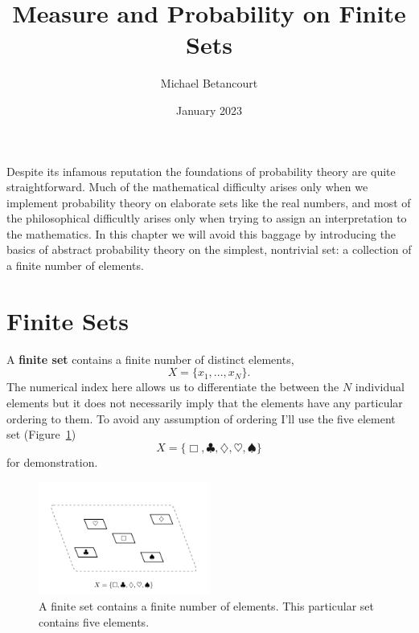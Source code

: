 \documentclass[
  letterpaper,
  DIV=11,
  numbers=noendperiod]{scrartcl}
\title{Measure and Probability on Finite Sets}
\author{Michael Betancourt}
\date{January 2023}
\renewcommand*\contentsname{Table of contents}
\newcommand\contentsname{Table of contents}
\begin{document}
\maketitle
\ifdefined\Shaded\renewenvironment{Shaded}{\begin{tcolorbox}[sharp corners, frame hidden, breakable, interior hidden, borderline west={3pt}{0pt}{shadecolor}, boxrule=0pt, enhanced]}{\end{tcolorbox}}\fi

\renewcommand*\contentsname{Table of contents}
{
\hypersetup{linkcolor=}
\setcounter{tocdepth}{3}
\tableofcontents
}
Despite its infamous reputation the foundations of probability theory
are quite straightforward. Much of the mathematical difficulty arises
only when we implement probability theory on elaborate sets like the
real numbers, and most of the philosophical difficultly arises only when
trying to assign an interpretation to the mathematics. In this chapter
we will avoid this baggage by introducing the basics of abstract
probability theory on the simplest, nontrivial set: a collection of a
finite number of elements.

\hypertarget{finite-sets}{%
\section{Finite Sets}\label{finite-sets}}

A \textbf{finite set} contains a finite number of distinct elements, \[
X = \{x_1, ..., x_N\}.
\] The numerical index here allows us to differentiate the between the
\(N\) individual elements but it does not necessarily imply that the
elements have any particular ordering to them. To avoid any assumption
of ordering I'll use the five element set (Figure~\ref{fig-ambient_set})
\[
X = \{\Box, \clubsuit, \diamondsuit, \heartsuit, \spadesuit\}
\] for demonstration.

\begin{figure}

{\centering \includegraphics[width=0.5\textwidth,height=\textheight]{figures/ambient_set/ambient_set.pdf}

}

\caption{\label{fig-ambient_set}A finite set contains a finite number of
elements. This particular set contains five elements.}

\end{figure}
\end{document}
